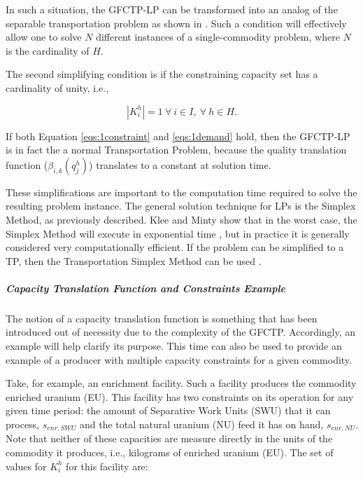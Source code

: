In such a situation, the GFCTP-LP can be transformed into an analog of the
separable transportation problem as shown in \cite{bertsekas_network_1998}. Such
a condition will effectively allow one to solve $N$ different instances of a
single-commodity problem, where $N$ is the cardinality of $H$. 

The second simplifying condition is if the constraining capacity set has a
cardinality of unity, i.e., 

\begin{equation}\label{eqs:1constraint}
  \left|{K_{i}^{h}}\right| = 1 \: \forall \: i \in I, \: \forall \: h \in H.
\end{equation}

If both Equation \ref{eqs:1constraint} and \ref{eqs:1demand} hold, then the
GFCTP-LP is in fact the a normal Transportation Problem, because the quality
translation function ($\beta_{i,k}(q_{j}^{h})$) translates to a constant at
solution time. 

These simplifications are important to the computation time required to solve
the resulting problem instance. The general solution technique for LPs is the
Simplex Method, as previously described. Klee and Minty show that in the worst
case, the Simplex Method will execute in exponential time \cite{klee_good_1970},
but in practice it is generally considered very computationally efficient. If
the problem can be simplified to a TP, then the Transportation Simplex Method
can be used \cite{ahuja_network_1993}.

\subparagraph{Capacity Translation Function and Constraints Example}

The notion of a capacity translation function is something that has been
introduced out of necessity due to the complexity of the GFCTP. Accordingly, an
example will help clarify its purpose. This time can also be used to provide an
example of a producer with multiple capacity constraints for a given commodity.

Take, for example, an enrichment facility. Such a facility produces the
commodity enriched uranium (EU). This facility has two constraints on its
operation for any given time period: the amount of Separative Work Units (SWU)
that it can process, $s_{enr,SWU}$ and the total natural uranium (NU) feed it
has on hand, $s_{enr,NU}$. Note that neither of these capacities are measure
directly in the units of the commodity it produces, i.e., kilograms of enriched
uranium (EU). The set of values for $K_{i}^{h}$ for this facility are:

